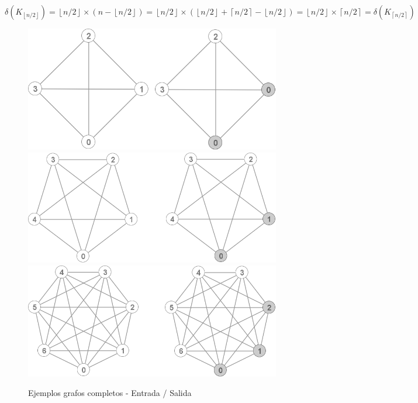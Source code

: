 	\( 
	\delta(K_{\left \lfloor{n/2}\right \rfloor}) = 
	\left \lfloor{n/2} \right \rfloor \times 
	(n - \left \lfloor{n/2} \right \rfloor ) = 
	\left \lfloor{n/2} \right \rfloor \times 
	(\left \lfloor{n/2} \right \rfloor +
	\left \lceil{n/2} \right \rceil - 
	\left \lfloor{n/2} \right \rfloor) =
	\left \lfloor{n/2} \right \rfloor \times
	\left \lceil{n/2} \right \rceil = 
	\delta(K_{\left \lceil{n/2}\right \rceil})
	\)
\begin{figure}[H]
\caption{Ejemplos grafos completos - Entrada / Salida}
\centering
\includegraphics[scale = 0.5]{img/ej2/k4.png}
\includegraphics[scale = 0.5]{img/ej2/k5.png}
\includegraphics[scale = 0.5]{img/ej2/k7.png}
\end{figure}

